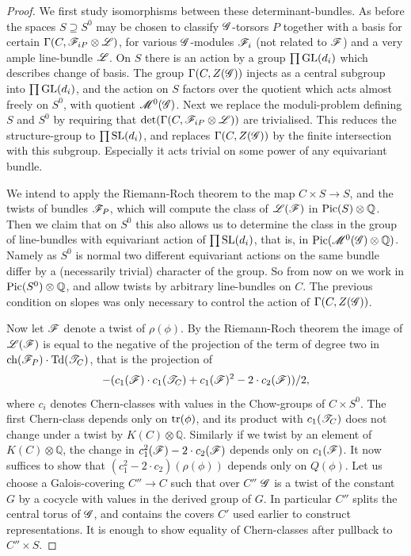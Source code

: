 \documentclass[12pt,english]{smfart}
\theoremstyle{plain} \newtheorem{innerthm}{Theorem} \newtheorem{innerlem}{Lemma} \newtheorem{innerprop}{Proposition} \newtheorem{innercor}{Corollary} \theoremstyle{definition} \newtheorem{innerdefn}{Definition} \newtheorem{innerconstr}{Construction} \theoremstyle{remark} \newtheorem*{remark}{Remark} \newtheorem*{remarks}{Remarks} \newtheorem*{applications}{Applications}
\begin{document}
\begin{proof}
We first study isomorphisms between these determinant-bundles. As before the spaces $S\supseteq S^0$ may be chosen to classify $\mathscr{G}$-torsors $P$ together with a basis for certain $\Gamma(C,\mathscr{F}_{iP}\otimes\mathscr{L})$, for various $\mathscr{G}$-modules $\mathscr{F}_i$ (not related to $\mathscr{F}$) and a very ample line-bundle $\mathscr{L}$. On $S$ there is an action by a group $\prod\operatorname{GL}(d_i)$ which describes change of basis. The group $\Gamma(C,Z(\mathscr{G}))$ injects as a central subgroup into $\prod\operatorname{GL}(d_i)$, and the action on $S$ factors over the quotient which acts almost freely on $S^0$, with quotient $\mathscr{M}^0(\mathscr{G})$. Next we replace the moduli-problem defining $S$ and $S^0$ by requiring that $\det(\Gamma(C,\mathscr{F}_{iP}\otimes\mathscr{L}))$ are trivialised. This reduces the structure-group to $\prod\operatorname{SL}(d_i)$, and replaces $\Gamma(C,Z(\mathscr{G}))$ by the finite intersection with this subgroup. Especially it acts trivial on some power of any equivariant bundle.

We intend to apply the Riemann-Roch theorem to the map $C\times S\to S$, and the twists of bundles $\mathscr{F}_P$, which will compute the class of $\mathscr{L}(\mathscr{F})$ in $\operatorname{Pic}(S)\otimes\mathbb{Q}$. Then we claim that on $S^0$ this also allows us to determine the class in the group of line-bundles with equivariant action of $\prod\operatorname{SL}(d_i)$, that is, in $\operatorname{Pic}(\mathscr{M}^0(\mathscr{G})\otimes\mathbb{Q})$. Namely as $S^0$ is normal two different equivariant actions on the same bundle differ by a (necessarily trivial) character of the group. So from now on we work in $\operatorname{Pic}(S^0)\otimes\mathbb{Q}$, and allow twists by arbitrary line-bundles on $C$. The previous condition on slopes was only necessary to control the action of $\Gamma(C,Z(\mathscr{G}))$.

Now let $\mathscr{F}$ denote a twist of $\rho(\phi)$. By the Riemann-Roch theorem the image of $\mathscr{L}(\mathscr{F})$ is equal to the negative of the projection of the term of degree two in $\operatorname{ch}(\mathscr{F}_P)\cdot\operatorname{Td}(\mathscr{T}_C)$, that is the projection of
\[
-(c_1(\mathscr{F})\cdot c_1(\mathscr{T}_C)+c_1(\mathscr{F})^2-2\cdot c_2(\mathscr{F}))/2,
\]
where $c_i$ denotes Chern-classes with values in the Chow-groups of $C\times S^0$. The first Chern-class depends only on $\operatorname{tr}(\phi)$, and its product with $c_1(\mathscr{T}_C)$
does not change under a twist by $K(C)\otimes\mathbb{Q}$. Similarly if we twist by an element of $K(C)\otimes\mathbb{Q}$, the change in $c_1^2(\mathscr{F})-2\cdot c_2(\mathscr{F})$ depends only on $c_1(\mathscr{F})$. It now suffices to show that $(c_1^2-2\cdot c_2)(\rho(\phi))$ depends only on $Q(\phi)$. Let us choose a Galois-covering $C''\to C$ such that over $C''$ $\mathscr{G}$ is a twist of the constant $G$ by a cocycle with values in the derived group of $G$. In particular $C''$ splits the central torus of $\mathscr{G}$, and contains the covers $C'$ used earlier to construct representations. It is enough to show equality of Chern-classes after pullback to $C''\times S$.


\end{proof}
\end{document}
